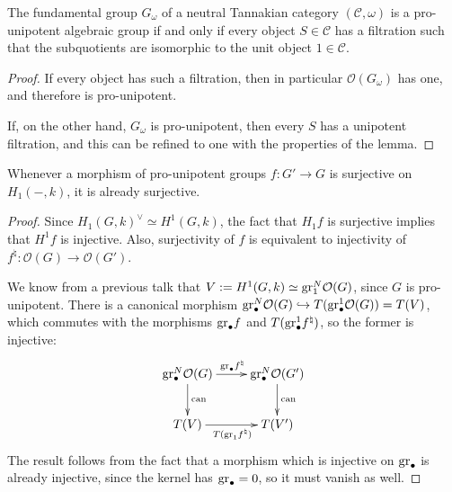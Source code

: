 \begin{lemma}
 The fundamental group $G_\omega$ of a neutral Tannakian category $(\mathcal{C},\omega)$ is a pro-unipotent algebraic group if and only if every object $S \in \mathcal{C}$ has a filtration such that the subquotients are isomorphic to the unit object $1 \in \mathcal{C}$.
\end{lemma}
\begin{proof}
If every object has such a filtration, then in particular $\mathcal{O}(G_\omega)$ has one, and therefore is pro-unipotent.

If, on the other hand, $G_\omega$ is pro-unipotent, then every $S$ has a unipotent filtration, and this can be refined to one with the properties of the lemma.
\end{proof}


\begin{lemma}\label{lem:prounisurj}
 Whenever a morphism of pro-unipotent groups $f : G' \to G$ is surjective on $H_1(-,k)$, it is already surjective.
\end{lemma}
\begin{proof}
Since $H_1(G,k)^\vee \simeq H^1(G,k)$, the fact that $H_1 f$ is surjective implies that $H^1 f$ is injective.
Also, surjectivity of $f$ is equivalent to injectivity of $f^\natural : \mathcal{O}(G) \to \mathcal{O}(G')$.

We know from a previous talk that $V := H^1(G,k) \simeq \mathrm{gr}_1^N \mathcal{O}(G)$, since $G$ is pro-unipotent.
There is a canonical morphism $\mathrm{gr}_\bullet^N \mathcal{O}(G) \hookrightarrow T(\mathrm{gr}_\bullet^1 \mathcal{O}(G)) = T(V)$,
which commutes with the morphisms $\mathrm{gr}_\bullet f$ and $T(\mathrm{gr}_\bullet^1 f^\natural)$, so the former is injective:
\[
\xymatrix{
\gr_{\bullet}^N \cO(G) \ar[d]^{\mathrm{can}} \ar[r]^{\gr_{\bullet} f^\natural} & \gr_{\bullet}^N \cO(G') \ar[d]^{\mathrm{can}} \\
T(V) \ar[r]_{T(\gr_1 f^\natural)} & T(V')
}
\]
The result follows from the fact that a morphism which is injective on $\mathrm{gr}_\bullet$ is already injective,
since the kernel has $\mathrm{gr}_\bullet = 0$, so it must vanish as well.
\end{proof}



